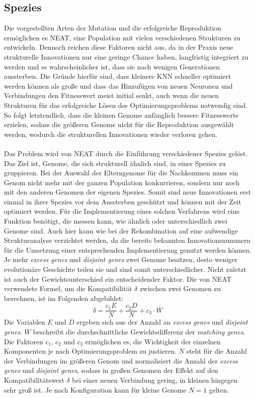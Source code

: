 \subsection{Spezies}
\label{subsec:neat_species}
Die vorgestellten Arten der Mutation und die erfolgreiche Reproduktion ermöglichen es \ac{NEAT}, eine Population mit vielen verschiedenen Strukturen zu entwickeln. Dennoch reichen diese Faktoren nicht aus, da in der Praxis neue strukturelle Innovationen nur eine geringe Chance haben, langfristig integriert zu werden und es wahrscheinlicher ist, dass sie nach wenigen Generationen aussterben. Die Gründe hierfür sind, dass kleinere \ac{KNN} schneller optimiert werden können als große und dass das Hinzufügen von neuen Neuronen und Verbindungen den Fitnesswert meist initial senkt, auch wenn die neuen Strukturen für das erfolgreiche Lösen des Optimierungsproblems notwendig sind. So folgt letztendlich, dass die kleinen Genome anfänglich bessere Fitnesswerte erzielen, sodass die größeren Genome nicht für die Reproduktion ausgewählt werden, wodurch die strukturellen Innovationen wieder verloren gehen.
\\\\
Das Problem wird von \ac{NEAT} durch die Einführung verschiedener Spezies gelöst. Das Ziel ist, Genome, die sich strukturell ähnlich sind, in einer Spezies zu gruppieren. Bei der Auswahl der Elterngenome für die Nachkommen muss ein Genom nicht mehr mit der ganzen Population konkurrieren, sondern nur noch mit den anderen Genomen der eigenen Spezies. Somit sind neue Innovationen erst einmal in ihrer Spezies vor dem Aussterben geschützt und können mit der Zeit optimiert werden. Für die Implementierung eines solchen Verfahrens wird eine Funktion benötigt, die messen kann, wie ähnlich oder unterschiedlich zwei Genome sind. Auch hier kann wie bei der Rekombination auf eine aufwendige Strukturanalyse verzichtet werden, da die bereits bekannten Innovationsnummern für die Umsetzung einer entsprechenden Implementierung genutzt werden können. Je mehr \emph{excess genes} und \emph{disjoint genes} zwei Genome besitzen, desto weniger evolutionäre Geschichte teilen sie und sind somit unterschiedlicher. Nicht zuletzt ist auch der Gewichtsunterschied ein entscheidender Faktor. Die von \ac{NEAT} verwendete Formel, um die Kompatibilität $\delta$ zwischen zwei Genomen zu berechnen, ist im Folgenden abgebildet:
$$\delta=\frac{c_1E}{N}+\frac{c_2D}{N}+c_3 \cdot \overline{W}$$
Die Variablen $E$ und $D$ ergeben sich aus der Anzahl an \emph{excess genes} und \emph{disjoint genes}. $\overline{W}$ beschreibt die durchschnittliche Gewichtsdifferenz der \emph{matching genes}. Die Faktoren $c_1$, $c_2$ und $c_3$ ermöglichen es, die Wichtigkeit der einzelnen Komponenten je nach Optimierungsproblem zu justieren. $N$ steht für die Anzahl der Verbindungen im größeren Genom und normalisiert die Anzahl der \emph{excess genes} und \emph{disjoint genes}, sodass in großen Genomen der Effekt auf den Kompatibilitätswert $\delta$ bei einer neuen Verbindung gering, in kleinen hingegen sehr groß ist. Je nach Konfiguration kann für kleine Genome $N=1$ gelten.
